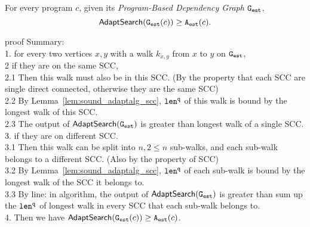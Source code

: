 \begin{thm}
  For every program $c$, given its \emph{Program-Based Dependency Graph} $\mathtt{{G_{est}}}$,
  \[ \mathsf{AdaptSearch}(\mathtt{{G_{est}}}({c})) \geq {\ensuremath{\mathtt{A_{est}}}}(c).\]
\end{thm}
proof Summary:
\\
1. for every two vertices $x, y$ with a walk $k_{x,y}$ from $x$ to $y$ on $\mathtt{{G_{est}}}$, 
\\
2 if they are on the same SCC, 
\\
2.1 Then this walk must also be in this SCC.
(By the property that each SCC are single direct connected, otherwise they are the same SCC)
\\
2.2 By Lemma~\ref{lem:sound_adaptalg_scc}, $\mathtt{len}^{\tt q}$ of this walk is bound by the longest walk of this SCC.
\\
2.3 The output of $\mathsf{AdaptSearch}(\mathtt{{G_{est}}})$ is greater than longest walk of a single SCC.
\\
3. if they are on different SCC. 
\\
3.1 Then this walk can be split into $n, 2 \leq n$ sub-walks, and each sub-walk belongs to a different SCC. (Also by the property of SCC)
\\
3.2 By Lemma~\ref{lem:sound_adaptalg_scc}, $\mathtt{len}^{\tt q}$ of each sub-walk is bound by the longest walk of the SCC it belongs to.
\\
3.3 By line: in algorithm, the output of $\mathsf{AdaptSearch}(\mathtt{{G_{est}}})$ is greater than sum up the $\mathtt{len}^{\tt q}$ of longest walk in every SCC that each sub-walk belongs to.
\\
4. Then we have
$\mathsf{AdaptSearch}(\mathtt{{G_{est}}}(c)) \geq {\ensuremath{\mathtt{A_{est}}}}(c)$.
